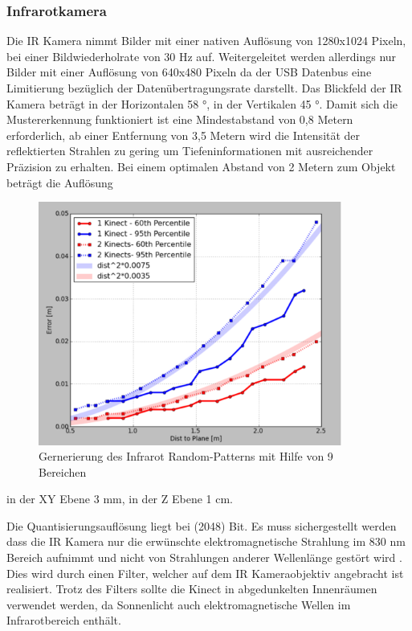 \subsubsection{Infrarotkamera}
Die IR Kamera nimmt Bilder mit einer nativen Auflösung von 1280x1024 Pixeln, bei einer Bildwiederholrate von 30 Hz auf. Weitergeleitet werden allerdings nur Bilder mit einer Auflösung von 640x480 Pixeln da der USB Datenbus eine Limitierung bezüglich der Datenübertragungsrate darstellt. Das Blickfeld der IR Kamera beträgt in der Horizontalen 58 °, in der Vertikalen 45 °. Damit sich die Mustererkennung funktioniert ist eine Mindestabstand von 0,8 Metern erforderlich, ab einer Entfernung von 3,5 Metern wird die Intensität der reflektierten Strahlen zu gering um Tiefeninformationen mit ausreichender Präzision zu erhalten.
Bei einem optimalen Abstand von 2 Metern zum Objekt beträgt die Auflösung 
\begin{figure}
  \vspace{-20pt}
  \begin{center}
        \includegraphics[height=8cm]{Res/Res_to_Dist.png}
  \end{center}
  \vspace{-20pt}
  \caption{Gernerierung des Infrarot Random-Patterns mit Hilfe von 9 Bereichen }
  \vspace{-10pt}
\end{figure}

in der XY Ebene 3 mm, in der Z Ebene 1 cm.

Die Quantisierungsauflösung liegt bei  (2048) Bit.
Es muss sichergestellt werden dass die IR Kamera nur die erwünschte elektromagnetische Strahlung im 830 nm Bereich aufnimmt und nicht von Strahlungen anderer Wellenlänge gestört wird . Dies wird durch einen Filter, welcher auf dem IR Kameraobjektiv angebracht ist realisiert.
Trotz des Filters sollte die Kinect in abgedunkelten Innenräumen verwendet werden, da  Sonnenlicht auch elektromagnetische Wellen im Infrarotbereich enthält.

